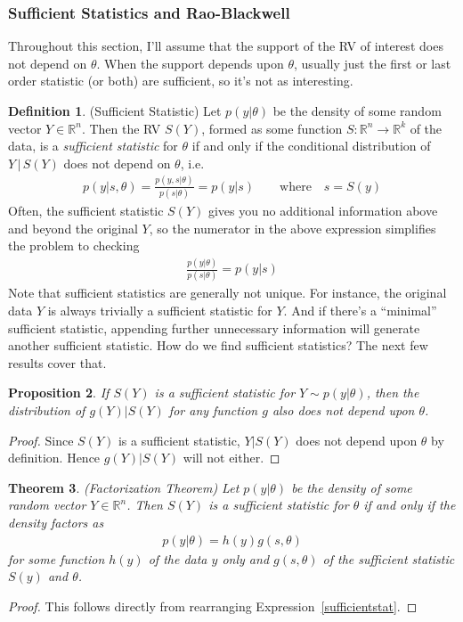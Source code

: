 \documentclass[12pt]{article}
\theoremstyle{plain}
\newtheorem{thm}{Theorem}[section]
\newtheorem{prop}[thm]{Proposition}
\theoremstyle{definition}
\newtheorem{defn}[thm]{Definition}
\theoremstyle{remark}
\newcommand{\ra}{\rightarrow}
\newcommand{\Rn}{\mathbb{R}^n}
\newcommand{\Rk}{\mathbb{R}^k}
\begin{document}
\clearpage
\subsubsection{Sufficient Statistics and Rao-Blackwell}


Throughout this section, I'll assume that the support of the RV of
interest does not depend on $\theta$.
When the support depends upon $\theta$, usually just the first or last
order statistic (or both) are sufficient, so it's not as interesting.

\begin{defn}(Sufficient Statistic)
Let $p(y|\theta)$ be the density of some random vector $Y\in\Rn$.  Then
the RV $S(Y)$, formed as some function $S:\Rn\ra\Rk$ of the data, is a
\emph{sufficient statistic} for $\theta$ if and only if the conditional
distribution of $Y\,|\,S(Y)$ does not depend on $\theta$, i.e.
\begin{align*}
  p(y|s,\theta)
  =
  \frac{p(y,s|\theta)}{p(s|\theta)}
  =
  p(y|s)
  \qquad \text{where}\quad
  s=S(y)
\end{align*}
Often, the sufficient statistic $S(Y)$ gives you no additional
information above and beyond the original $Y$, so the numerator in the
above expression simplifies the problem to checking
\begin{align}
  \frac{p(y|\theta)}{p(s|\theta)}
  =
  p(y|s)
  \label{sufficientstat}
\end{align}
Note that sufficient statistics are generally not unique.
For instance, the original data $Y$ is always trivially a sufficient
statistic for $Y$. And if there's a ``minimal'' sufficient statistic,
appending further unnecessary information will generate another
sufficient statistic.
How do we find sufficient statistics? The next few results cover that.
\end{defn}

\begin{prop}
If $S(Y)$ is a sufficient statistic for $Y\sim p(y|\theta)$, then the
distribution of $g(Y)|S(Y)$ for any function $g$ \emph{also} does not
depend upon $\theta$.
\end{prop}
\begin{proof}
Since $S(Y)$ is a sufficient statistic, $Y|S(Y)$ does not depend upon
$\theta$ by definition. Hence $g(Y)|S(Y)$ will not either.
\end{proof}

\begin{thm}\emph{(Factorization Theorem)}
Let $p(y|\theta)$ be the density of some random vector $Y\in\Rn$.
Then $S(Y)$ is a sufficient statistic for $\theta$ if and only if the
density factors as
\begin{align}
  p(y|\theta)
  = h(y) g(s,\theta)
  \label{factorization}
\end{align}
for some function $h(y)$ of the data $y$ only and $g(s,\theta)$ of the
sufficient statistic $S(y)$ and $\theta$.
\end{thm}
\begin{proof}
This follows directly from rearranging Expression~\ref{sufficientstat}.
\end{proof}
\end{document}
